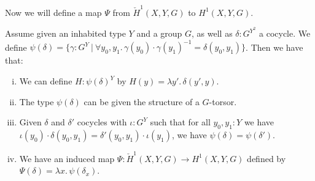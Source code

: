 Now we will define a map $\Psi$ from $\check{H}^1(X,Y,G)$ to $H^1(X,Y,G)$.

\begin{lemma}\label{psi-well-defined}
Assume given an inhabited type $Y$ and a group $G$, as well as $\delta:G^{Y^2}$ a cocycle. %
We define $\psi(\delta) = \{\gamma:G^Y\ |\ \forall y_0,y_1.\, \gamma(y_0)\cdot\gamma(y_1)^{-1} = \delta(y_0,y_1)\}$. Then we have that:

\begin{enumerate}[(i)] 
  \item\label{Hdef} We can define $H:\psi(\delta)^Y$ by $H(y) = \lambda y'.\, \delta(y',y)$.
\item The type $\psi(\delta)$ can be given the structure of a $G$-torsor.
\item Given $\delta$ and $\delta'$ cocycles with $\iota:G^Y$ such that for all $y_0,y_1:Y$ we have $\iota(y_0)\cdot\delta(y_0,y_1) = \delta'(y_0,y_1)\cdot\iota(y_1)$, we have $\psi(\delta)=\psi(\delta')$.
\item We have an induced map $\Psi : \check{H}^1(X,Y,G)\to H^1(X,Y,G)$ defined by $\Psi(\delta) = \lambda x.\, \psi(\delta_x)$.
\end{enumerate}
\end{lemma}

